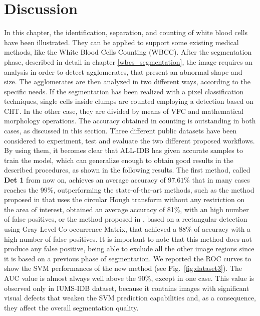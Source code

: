 \documentclass[final,a4paper,12pt,english]{UnicaPhdThesis3}
\begin{document}
{\section{Discussion}
In this chapter, the identification, separation, and counting of white blood cells have been illustrated. They can be applied to support some existing medical methods, like the White Blood Cells Counting (\acs{WBCC}). After the segmentation phase, described in detail in chapter \ref{wbcs_segmentation}, the image requires an analysis in order to detect agglomerates, that present an abnormal shape and size. The agglomerates are then analyzed in two different ways, according to the specific needs. If the segmentation has been realized with a pixel classification techniques, single cells inside clumps are counted employing a detection based on CHT. In the other case, they are divided by means of VFC and mathematical morphology operations. The accuracy obtained in counting is outstanding in both cases, as discussed in this section.
Three different public datasets have been considered to experiment, test and evaluate the two different proposed workflows. By using them, it becomes clear that ALL-IDB has given accurate samples to train the model, which can generalize enough to obtain good results in the described procedures, as shown in the following results.
The first method, called \textbf{Det 1} from now on, achieves an average accuracy of $97.61\%$ that in many cases reaches the $99\%$, outperforming the state-of-the-art methods, such as the method proposed in \cite{Mahmood} that uses the circular Hough transform without any restriction on the area of interest, obtained an average accuracy of 81\%, with an high number of false positives, or the method proposed in \cite{Alilou}, based on a rectangular detection using Gray Level Co-occurrence Matrix, that achieved a 88\% of accuracy with a high number of false positives. It is important to note that this method does not produce any false positive, being able to exclude all the other image regions since it is based on a previous phase of segmentation. 
We reported the ROC curves to show the SVM performances of the new method (see Fig.~\ref{fig:dataset3}). The AUC value is almost always well above the 90\%, except in one case. This value is observed only in IUMS-IDB dataset, because it contains images with significant visual defects that weaken the SVM prediction capabilities and, as a consequence, they affect the overall segmentation quality.

}
\end{document}
